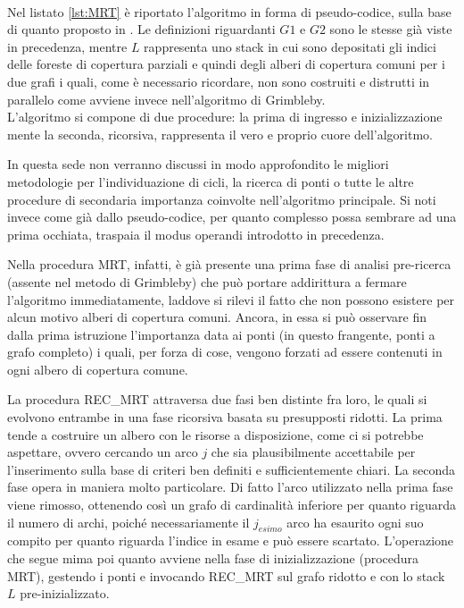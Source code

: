 \paragraph{}
Nel listato \ref{lst:MRT} è riportato l'algoritmo in forma di pseudo-codice, sulla base di quanto proposto in \cite{MRT}. Le definizioni riguardanti $G1$ e $G2$ sono le stesse già viste in precedenza, mentre $L$ rappresenta uno stack in cui sono depositati gli indici delle foreste di copertura parziali e quindi degli alberi di copertura comuni per i due grafi i quali, come è necessario ricordare, non sono costruiti e distrutti in parallelo come avviene invece nell'algoritmo di Grimbleby.\\
L'algoritmo si compone di due procedure: la prima di ingresso e inizializzazione mente la seconda, ricorsiva, rappresenta il vero e proprio cuore dell'algoritmo.

In questa sede non verranno discussi in modo approfondito le migliori metodologie per l'individuazione di cicli, la ricerca di ponti o tutte le altre procedure di secondaria importanza coinvolte nell'algoritmo principale. Si noti invece come già dallo pseudo-codice, per quanto complesso possa sembrare ad una prima occhiata, traspaia il modus operandi introdotto in precedenza.

Nella procedura MRT, infatti, è già presente una prima fase di analisi pre-ricerca (assente nel metodo di Grimbleby) che può portare addirittura a fermare l'algoritmo immediatamente, laddove si rilevi il fatto che non possono esistere per alcun motivo alberi di copertura comuni. Ancora, in essa si può osservare fin dalla prima istruzione l'importanza data ai ponti (in questo frangente, ponti a grafo completo) i quali, per forza di cose, vengono forzati ad essere contenuti in ogni albero di copertura comune.

La procedura REC\_MRT attraversa due fasi ben distinte fra loro, le quali si evolvono entrambe in una fase ricorsiva basata su presupposti ridotti. La prima tende a costruire un albero con le risorse a disposizione, come ci si potrebbe aspettare, ovvero cercando un arco $j$ che sia plausibilmente accettabile per l'inserimento sulla base di criteri ben definiti e sufficientemente chiari. La seconda fase opera in maniera molto particolare. Di fatto l'arco utilizzato nella prima fase viene rimosso, ottenendo così un grafo di cardinalità inferiore per quanto riguarda il numero di archi, poiché necessariamente il $j_{esimo}$ arco ha esaurito ogni suo compito per quanto riguarda l'indice in esame e può essere scartato. L'operazione che segue mima poi quanto avviene nella fase di inizializzazione (procedura MRT), gestendo i ponti e invocando REC\_MRT sul grafo ridotto e con lo stack $L$ pre-inizializzato.

